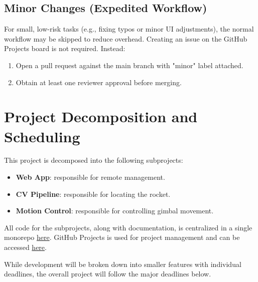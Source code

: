\documentclass{article}
\begin{document}
\subsection{Minor Changes (Expedited Workflow)}

For small, low-risk tasks (e.g., fixing typos or minor UI adjustments), the
normal workflow may be skipped to reduce overhead. Creating an issue on the
GitHub Projects board is not required. Instead:
\begin{enumerate}
  \item Open a pull request against the main branch with "minor" label attached.
  \item Obtain at least one reviewer approval before merging.
\end{enumerate}

\section{Project Decomposition and Scheduling}

This project is decomposed into the following subprojects:

\begin{itemize}
  \item \textbf{Web App}: responsible for remote management.
  \item \textbf{CV Pipeline}: responsible for locating the rocket.
  \item \textbf{Motion Control}: responsible for controlling gimbal movement.
\end{itemize}

All code for the subprojects, along with documentation, is centralized in a
single monorepo \href{https://github.com/ZifanSi/vision-guided-tracker}{here}.
GitHub Projects is used for project management and can be accessed
\href{https://github.com/users/ZifanSi/projects/1}{here}.

While development will be broken down into smaller features with individual
deadlines, the overall project will follow the major deadlines below.
\end{document}
